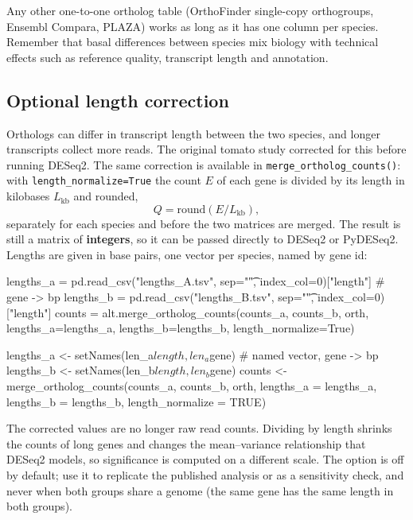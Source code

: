 \documentclass[11pt,a4paper]{article}
\newcommand{\code}[1]{\texttt{\color{navy!85!black}#1}}
\begin{document}
Any other one-to-one ortholog table (OrthoFinder single-copy orthogroups, Ensembl Compara, PLAZA)
works as long as it has one column per species. Remember that basal differences between species mix
biology with technical effects such as reference quality, transcript length and annotation.

\subsection{Optional length correction}

Orthologs can differ in transcript length between the two species, and longer transcripts collect
more reads. The original tomato study corrected for this before running DESeq2. The same correction is
available in \code{merge\_ortholog\_counts()}: with \code{length\_normalize=True} the count \(E\) of each
gene is divided by its length in kilobases \(L_{\mathrm{kb}}\) and rounded,
\[ Q = \mathrm{round}\!\left(E / L_{\mathrm{kb}}\right), \]
separately for each species and before the two matrices are merged. The result is still a matrix of
\textbf{integers}, so it can be passed directly to DESeq2 or PyDESeq2. Lengths are given in base pairs,
one vector per species, named by gene id:

\begin{pycode}
lengths_a = pd.read_csv("lengths_A.tsv", sep="\t", index_col=0)["length"]   # gene -> bp
lengths_b = pd.read_csv("lengths_B.tsv", sep="\t", index_col=0)["length"]
counts = alt.merge_ortholog_counts(counts_a, counts_b, orth,
                                   lengths_a=lengths_a, lengths_b=lengths_b,
                                   length_normalize=True)
\end{pycode}

\begin{rcode}
lengths_a <- setNames(len_a$length, len_a$gene)   # named vector, gene -> bp
lengths_b <- setNames(len_b$length, len_b$gene)
counts <- merge_ortholog_counts(counts_a, counts_b, orth,
                                lengths_a = lengths_a, lengths_b = lengths_b,
                                length_normalize = TRUE)
\end{rcode}

\begin{caution}
The corrected values are no longer raw read counts. Dividing by length shrinks the counts of long genes
and changes the mean--variance relationship that DESeq2 models, so significance is computed on a
different scale. The option is off by default; use it to replicate the published analysis or as a
sensitivity check, and never when both groups share a genome (the same gene has the same length in
both groups).
\end{caution}
\end{document}
